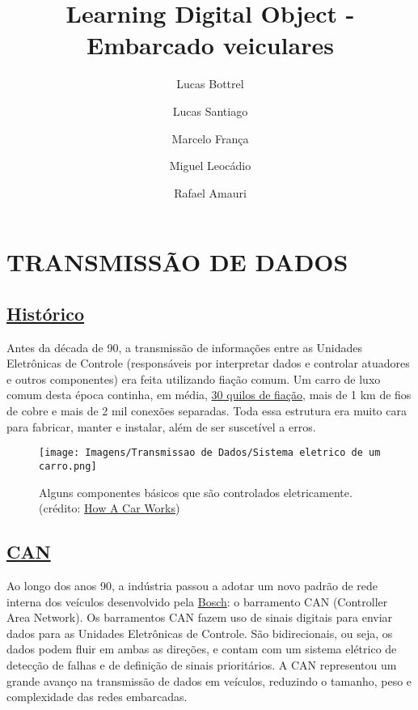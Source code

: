 \documentclass{article}
\title{Learning Digital Object - Embarcado veiculares}
\author{Lucas Bottrel \and Lucas Santiago \and Marcelo França \and Miguel Leocádio \and Rafael Amauri}
\begin{document}
\maketitle

\newpage

\section*{TRANSMISSÃO DE DADOS}
\subsection*{\underline{Histórico}}

\hspace{4pt} Antes da década de 90, a transmissão de informações entre as Unidades Eletrônicas de Controle (responsáveis por 
interpretar dados e controlar atuadores e outros componentes) era feita utilizando fiação comum. Um carro de luxo 
comum desta época continha, em média, \href{https://www.youtube.com/watch?v=ptH8zxhf-jM}{30 quilos de fiação}, mais de 1 km de fios de cobre e mais de 2 mil conexões separadas. 
Toda essa estrutura era muito cara para fabricar, manter e instalar, além de ser suscetível a erros.


\begin{frame}

    \begin{figure}[ht]
        \centering
        \texttt{[image: Imagens/Transmissao de Dados/Sistema eletrico de um carro.png]}
        \caption{Alguns componentes básicos que são controlados eletricamente. (crédito: \href{https://www.howacarworks.com/basics/how-car-electrical-systems-work}{How A Car Works})}
    \end{figure}

\end{frame}

\subsection*{\underline{CAN}}

\hspace{4pt} Ao longo dos anos 90, a indústria passou a adotar um novo padrão de rede interna dos veículos desenvolvido pela \href{http://esd.cs.ucr.edu/webres/can20.pdf}{Bosch}: o barramento CAN (Controller Area Network).
Os barramentos CAN fazem uso de sinais digitais para enviar dados para as Unidades Eletrônicas de Controle. São bidirecionais, ou seja, os dados podem fluir em ambas as direções, e contam com um sistema elétrico de detecção de falhas e de definição de sinais prioritários. A CAN representou um grande avanço na transmissão de dados em veículos, reduzindo o tamanho, peso e complexidade das redes embarcadas.
\end{document}

